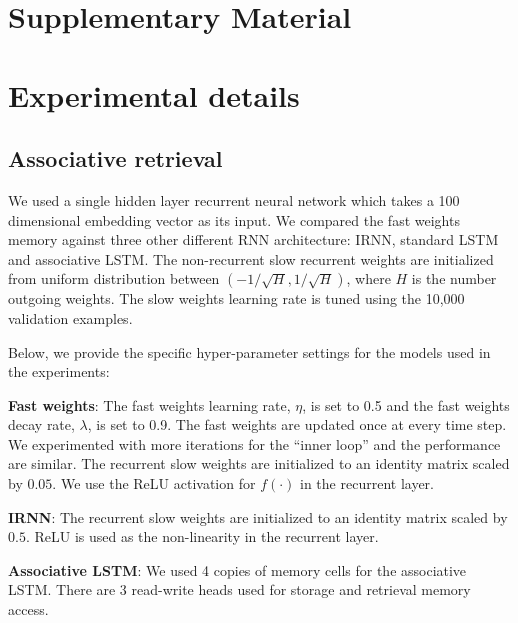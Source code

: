 \documentclass{article}
\begin{document}
\begin{footnotesize}
  \setlength{\bibsep}{5pt plus 2.0ex}

\end{footnotesize}


\appendix
{}
\section*{Supplementary Material}

\section{Experimental details}
\subsection{Associative retrieval}

We used a single hidden layer recurrent neural network which takes a 100 dimensional embedding vector as its input. We compared the fast weights memory against three other different RNN architecture: IRNN, standard LSTM and associative LSTM. The non-recurrent slow recurrent weights are initialized from uniform distribution between $(-1/\sqrt{H}, 1/\sqrt{H})$, where $H$ is the number outgoing weights. The slow weights learning rate is tuned using the 10,000 validation examples. 

\vspace{0.1in}

Below, we provide the specific hyper-parameter settings for the models used in the experiments:

\textbf{Fast weights}: The fast weights learning rate, $\eta$, is set to 0.5 and the fast weights decay rate, $\lambda$, is set to 0.9. The fast weights are updated once at every time step. We experimented with more iterations for the ``inner loop'' and the performance are similar. The recurrent slow weights are initialized to an identity matrix scaled by $0.05$. We use the ReLU activation for $f(\cdot)$ in the recurrent layer.

\vspace{0.1in}

\textbf{IRNN}: The recurrent slow weights are initialized to an identity matrix scaled by $0.5$. ReLU is used as the non-linearity in the recurrent layer.

\vspace{0.1in}

\textbf{Associative LSTM}: We used 4 copies of memory cells for the associative LSTM. There are 3 read-write heads used for storage and retrieval memory access. 
\end{document}
